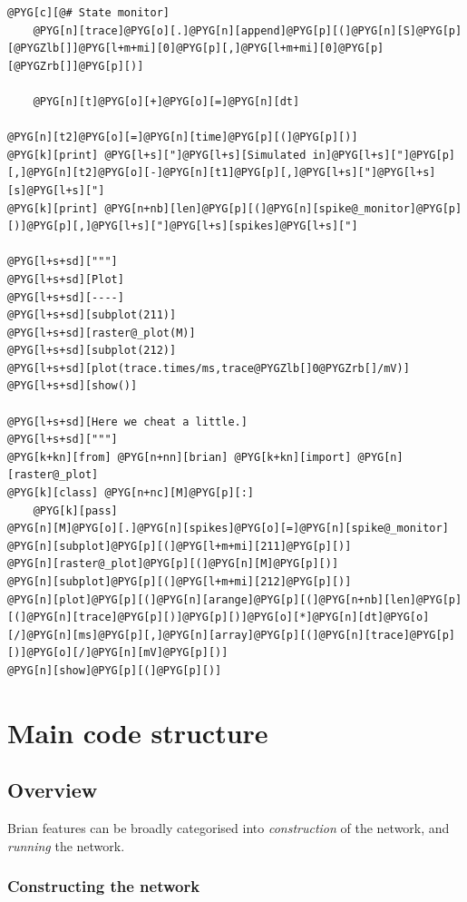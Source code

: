 \documentclass[letterpaper,10pt,english]{manual}
\begin{document}
\begin{Verbatim}[commandchars=@\[\]]
    @PYG[c][@# State monitor]
    @PYG[n][trace]@PYG[o][.]@PYG[n][append]@PYG[p][(]@PYG[n][S]@PYG[p][@PYGZlb[]]@PYG[l+m+mi][0]@PYG[p][,]@PYG[l+m+mi][0]@PYG[p][@PYGZrb[]]@PYG[p][)]

    @PYG[n][t]@PYG[o][+]@PYG[o][=]@PYG[n][dt]

@PYG[n][t2]@PYG[o][=]@PYG[n][time]@PYG[p][(]@PYG[p][)]
@PYG[k][print] @PYG[l+s]["]@PYG[l+s][Simulated in]@PYG[l+s]["]@PYG[p][,]@PYG[n][t2]@PYG[o][-]@PYG[n][t1]@PYG[p][,]@PYG[l+s]["]@PYG[l+s][s]@PYG[l+s]["]
@PYG[k][print] @PYG[n+nb][len]@PYG[p][(]@PYG[n][spike@_monitor]@PYG[p][)]@PYG[p][,]@PYG[l+s]["]@PYG[l+s][spikes]@PYG[l+s]["]

@PYG[l+s+sd]["""]
@PYG[l+s+sd][Plot]
@PYG[l+s+sd][----]
@PYG[l+s+sd][subplot(211)]
@PYG[l+s+sd][raster@_plot(M)]
@PYG[l+s+sd][subplot(212)]
@PYG[l+s+sd][plot(trace.times/ms,trace@PYGZlb[]0@PYGZrb[]/mV)]
@PYG[l+s+sd][show()]

@PYG[l+s+sd][Here we cheat a little.]
@PYG[l+s+sd]["""]
@PYG[k+kn][from] @PYG[n+nn][brian] @PYG[k+kn][import] @PYG[n][raster@_plot]
@PYG[k][class] @PYG[n+nc][M]@PYG[p][:]
    @PYG[k][pass]
@PYG[n][M]@PYG[o][.]@PYG[n][spikes]@PYG[o][=]@PYG[n][spike@_monitor]
@PYG[n][subplot]@PYG[p][(]@PYG[l+m+mi][211]@PYG[p][)]
@PYG[n][raster@_plot]@PYG[p][(]@PYG[n][M]@PYG[p][)]
@PYG[n][subplot]@PYG[p][(]@PYG[l+m+mi][212]@PYG[p][)]
@PYG[n][plot]@PYG[p][(]@PYG[n][arange]@PYG[p][(]@PYG[n+nb][len]@PYG[p][(]@PYG[n][trace]@PYG[p][)]@PYG[p][)]@PYG[o][*]@PYG[n][dt]@PYG[o][/]@PYG[n][ms]@PYG[p][,]@PYG[n][array]@PYG[p][(]@PYG[n][trace]@PYG[p][)]@PYG[o][/]@PYG[n][mV]@PYG[p][)]
@PYG[n][show]@PYG[p][(]@PYG[p][)]
\end{Verbatim}

\resetcurrentobjects
\hypertarget{--doc-developer-codestructure}{}

\section{Main code structure}


\subsection{Overview}

Brian features can be broadly categorised into \emph{construction} of the network,
and \emph{running} the network.


\subsubsection{Constructing the network}
\end{document}
